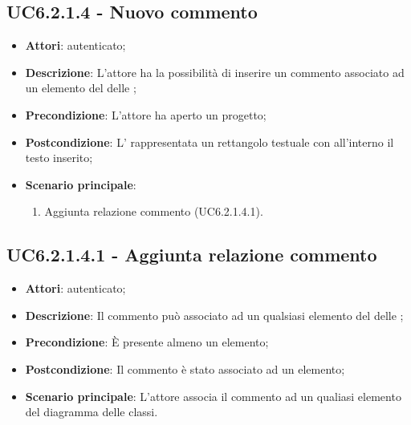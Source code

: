 \subsection{UC6.2.1.4 - Nuovo commento}
\label{ssec:UC6.2.1.4}
\begin{itemize}
\item \textbf{Attori}:  autenticato;
\item \textbf{Descrizione}: L'attore ha la possibilità di inserire un commento associato ad un elemento del  delle ;
\item \textbf{Precondizione}: L'attore ha aperto un progetto;
\item \textbf{Postcondizione}: L' rappresentata un rettangolo testuale con all'interno il testo inserito;
\item \textbf{Scenario principale}: \begin{enumerate}\item Aggiunta relazione commento (UC6.2.1.4.1).
 \end{enumerate}
\end{itemize}
\subsection{UC6.2.1.4.1 - Aggiunta relazione commento}
\label{ssec:UC6.2.1.4.1}
\begin{itemize}
\item \textbf{Attori}:  autenticato;
\item \textbf{Descrizione}: Il commento può associato ad un qualsiasi elemento del  delle ;
\item \textbf{Precondizione}: È presente almeno un elemento;
\item \textbf{Postcondizione}: Il commento è stato associato ad un elemento;
\item \textbf{Scenario principale}: L'attore associa il commento ad un qualiasi elemento del diagramma delle classi.
\end{itemize}

